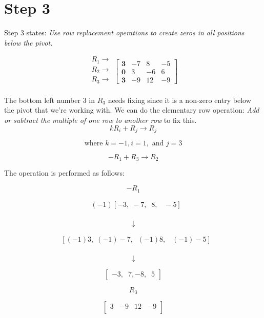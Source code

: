\documentclass[
  letterpaper,
  DIV=11,
  numbers=noendperiod]{scrreprt}
\begin{document}
\chapter{Step 3}

Step 3 states: \emph{Use row replacement operations to create zeros in
all positions below the pivot.}

\[
\begin{array}{c}
    R_1\rightarrow\\
    R_2\rightarrow\\
    R_3\rightarrow\\
\end{array}
\left[\begin{array}{ccc}
    \mathbf{3} & -7 & 8 & -5  \\
    \mathbf{0} & 3 & -6 & 6   \\
    \mathbf{3} & -9 & 12 & -9
\end{array}\right]
\]

The bottom left number \(3\) in \(R_3\) needs fixing since it is a
non-zero entry below the pivot that we're working with. We can do the
elementary row operation: \emph{Add or subtract the multiple of one row
to another row} to fix this. \[
kR_i + R_j \rightarrow R_j
\]

\[
\text{where } k = -1, i = 1, \text{ and } j = 3
\]

\[
-R_1 + R_3 \rightarrow R_2
\]

The operation is performed as follows:

\[
-R_1
\]

\[
\begin{align*}
    &(-1)\left[ -3,  \;-7, \;\; 8, \;\;\; -5 \right] \\
\end{align*}
\]

\[
\downarrow
\]

\[
\begin{align*}
    &\left[ (-1)3,  \;(-1)-7, \;\; (-1)8, \;\;\; (-1)-5 \right] \\
\end{align*}
\]

\[
\downarrow
\]

\[
\begin{bmatrix}
    -3, \;\;7, -8, \;\;5
\end{bmatrix}
\]

\[
R_3
\]

\[
\begin{bmatrix}
    3 & -9 & 12 & -9 \\
\end{bmatrix}
\]
\end{document}

